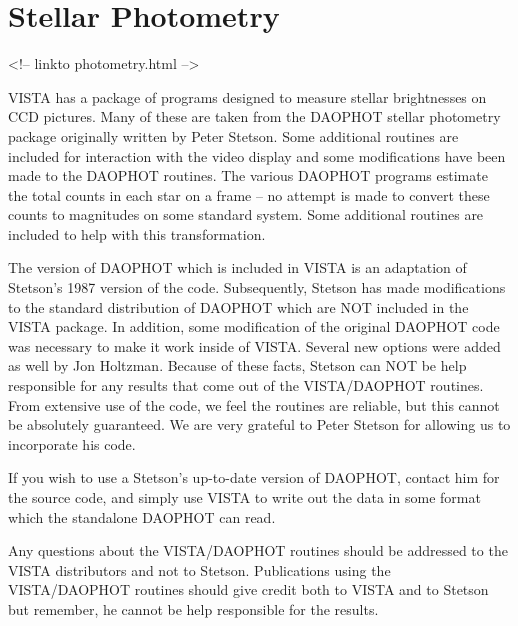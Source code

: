 \chapter{Stellar Photometry}
\begin{rawhtml}
<!-- linkto photometry.html -->
\end{rawhtml}

%
%


VISTA has a package of programs designed to measure stellar brightnesses on
CCD pictures. Many of these are taken from the DAOPHOT stellar photometry
package originally written by Peter Stetson. Some additional routines are
included for interaction with the video display and some modifications have
been made to the DAOPHOT routines. The various DAOPHOT programs estimate
the total counts in each star on a frame -- no attempt is made to convert
these counts to magnitudes on some standard system. Some additional
routines are included to help with this transformation.

The version of DAOPHOT which is included in VISTA is an adaptation of
Stetson's 1987 version of the code. Subsequently, Stetson has made
modifications to the standard distribution of DAOPHOT which are NOT
included in the VISTA package. In addition, some modification of the
original DAOPHOT code was necessary to make it work inside of VISTA.
Several new options were added as well by Jon Holtzman. Because of these
facts, Stetson can NOT be help responsible for any results that come out of
the VISTA/DAOPHOT routines. From extensive use of the code, we feel the
routines are reliable, but this cannot be absolutely guaranteed. We are
very grateful to Peter Stetson for allowing us to incorporate his code.

If you wish to use a Stetson's up-to-date version of DAOPHOT, contact him
for the source code, and simply use VISTA to write out the data in some
format which the standalone DAOPHOT can read.

Any questions about the VISTA/DAOPHOT routines should be addressed to the
VISTA distributors and not to Stetson. Publications using the VISTA/DAOPHOT
routines should give credit both to VISTA and to Stetson but remember, he
cannot be help responsible for the results.

